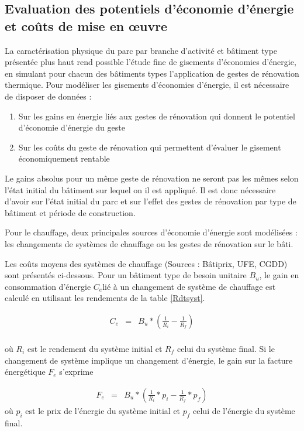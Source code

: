 \documentclass[10.5pt,a4paper]{article}
\begin{document}
{\subsection{Evaluation des potentiels d'économie d'énergie et coûts de mise en œuvre}

La caractérisation physique du parc par branche d’activité et bâtiment type présentée plus haut rend possible l’étude fine de gisements d’économies d’énergie, en simulant pour chacun des bâtiments types l’application de gestes de rénovation thermique. Pour modéliser les gisements d'économies d'énergie, il est nécessaire de disposer de données : 

\begin{enumerate}
	\item Sur les gains en énergie liés aux gestes de rénovation qui donnent le potentiel d'économie d'énergie du geste 
	\item Sur les coûts du geste de rénovation qui permettent d'évaluer le gisement économiquement rentable
\end{enumerate}

Le gains absolus pour un même geste de rénovation ne seront pas les mêmes selon l'état initial du bâtiment sur lequel on il est appliqué. Il est donc nécessaire d'avoir sur l'état initial du parc et sur l'effet des gestes de rénovation par type de bâtiment et période de construction.   

Pour le chauffage, deux principales sources d'économie d'énergie sont modélisées : les changements de systèmes de chauffage ou les gestes de rénovation sur le bâti. 

Les coûts moyens des systèmes de chauffage (Sources : Bâtiprix, UFE, CGDD) sont présentés ci-dessous. Pour un bâtiment type de besoin unitaire $B_u$, le gain en consommation d'énergie  $C_e$lié à un changement de système de chauffage est calculé en utilisant les rendements de la table \ref{Rdtsyst}. 

\begin{eqnarray}
 C_e &= &B_u * ( \frac{1}{R_i} -  \frac{1}{R_f}) \\
\end{eqnarray}

où $R_i$ est le rendement du système initial et $R_f$ celui du système final. Si le changement de système implique un changement d'énergie, le gain sur la facture énergétique  $F_e$ s'exprime

\begin{eqnarray}
 F_e &= & B_u * ( \frac{1}{R_i} * p_i -  \frac{1}{R_f}* p_f)  
\end{eqnarray}
où $p_i$ est le prix de l'énergie du système initial et $p_f$ celui de l'énergie du système final.  


}
\end{document}
